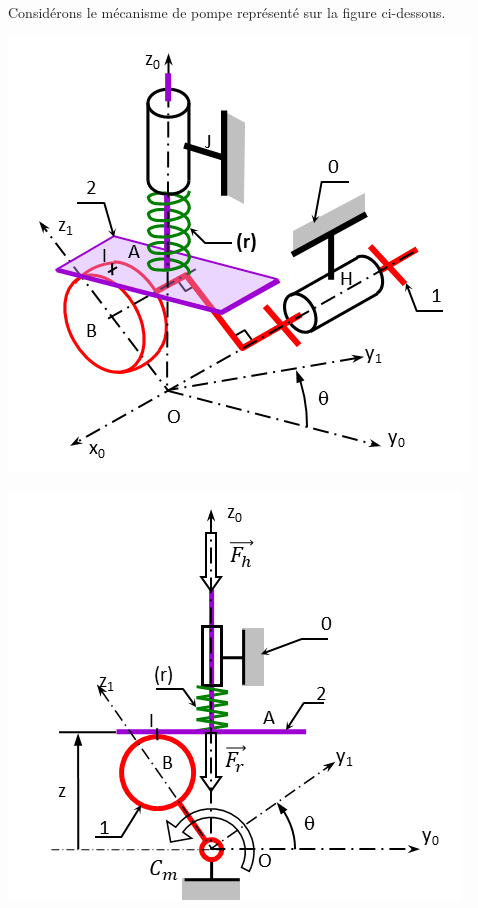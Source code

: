 \documentclass[10pt,fleqn]{article} %
\begin{document}
\def\pathfig{images}

\vspace{5cm}
\pagestyle{fancy}
\thispagestyle{plain}

\def\columnseprulecolor{\color{ocre}}
\setlength{\columnseprule}{0.4pt} 

\def\pathfig{images}

\ifprof
\else
\begin{multicols}{2}
\fi



Considérons le mécanisme de pompe représenté sur la figure ci-dessous.

\begin{center}
\includegraphics[width=\linewidth]{images/fig_01}
\end{center}


\begin{center}
\includegraphics[width=\linewidth]{images/fig_02}
\end{center}


\end{multicols}
\end{document}
